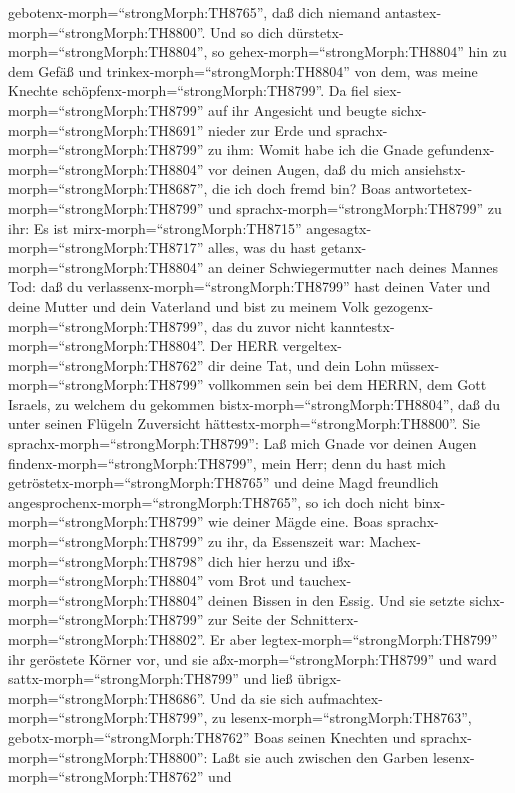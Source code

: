 gebotenx-morph=``strongMorph:TH8765'', daß dich niemand
antastex-morph=``strongMorph:TH8800''. Und so dich
dürstetx-morph=``strongMorph:TH8804'', so
gehex-morph=``strongMorph:TH8804'' hin zu dem Gefäß und
trinkex-morph=``strongMorph:TH8804'' von dem, was meine Knechte
schöpfenx-morph=``strongMorph:TH8799''.  Da fiel
siex-morph=``strongMorph:TH8799'' auf ihr Angesicht und beugte
sichx-morph=``strongMorph:TH8691'' nieder zur Erde und
sprachx-morph=``strongMorph:TH8799'' zu ihm: Womit habe ich die Gnade
gefundenx-morph=``strongMorph:TH8804'' vor deinen Augen, daß du mich
ansiehstx-morph=``strongMorph:TH8687'', die ich doch fremd bin?
 Boas antwortetex-morph=``strongMorph:TH8799'' und
sprachx-morph=``strongMorph:TH8799'' zu ihr: Es ist
mirx-morph=``strongMorph:TH8715'' angesagtx-morph=``strongMorph:TH8717''
alles, was du hast getanx-morph=``strongMorph:TH8804'' an deiner
Schwiegermutter nach deines Mannes Tod: daß du
verlassenx-morph=``strongMorph:TH8799'' hast deinen Vater und deine
Mutter und dein Vaterland und bist zu meinem Volk
gezogenx-morph=``strongMorph:TH8799'', das du zuvor nicht
kanntestx-morph=``strongMorph:TH8804''.  Der HERR
vergeltex-morph=``strongMorph:TH8762'' dir deine Tat, und dein Lohn
müssex-morph=``strongMorph:TH8799'' vollkommen sein bei dem HERRN, dem
Gott Israels, zu welchem du gekommen bistx-morph=``strongMorph:TH8804'',
daß du unter seinen Flügeln Zuversicht
hättestx-morph=``strongMorph:TH8800''.  Sie
sprachx-morph=``strongMorph:TH8799'': Laß mich Gnade vor deinen Augen
findenx-morph=``strongMorph:TH8799'', mein Herr; denn du hast mich
getröstetx-morph=``strongMorph:TH8765'' und deine Magd freundlich
angesprochenx-morph=``strongMorph:TH8765'', so ich doch nicht
binx-morph=``strongMorph:TH8799'' wie deiner Mägde eine. 
Boas sprachx-morph=``strongMorph:TH8799'' zu ihr, da Essenszeit war:
Machex-morph=``strongMorph:TH8798'' dich hier herzu und
ißx-morph=``strongMorph:TH8804'' vom Brot und
tauchex-morph=``strongMorph:TH8804'' deinen Bissen in den Essig. Und sie
setzte sichx-morph=``strongMorph:TH8799'' zur Seite der
Schnitterx-morph=``strongMorph:TH8802''. Er aber
legtex-morph=``strongMorph:TH8799'' ihr geröstete Körner vor, und sie
aßx-morph=``strongMorph:TH8799'' und ward
sattx-morph=``strongMorph:TH8799'' und ließ
übrigx-morph=``strongMorph:TH8686''.  Und da sie sich
aufmachtex-morph=``strongMorph:TH8799'', zu
lesenx-morph=``strongMorph:TH8763'', gebotx-morph=``strongMorph:TH8762''
Boas seinen Knechten und sprachx-morph=``strongMorph:TH8800'': Laßt sie
auch zwischen den Garben lesenx-morph=``strongMorph:TH8762'' und
